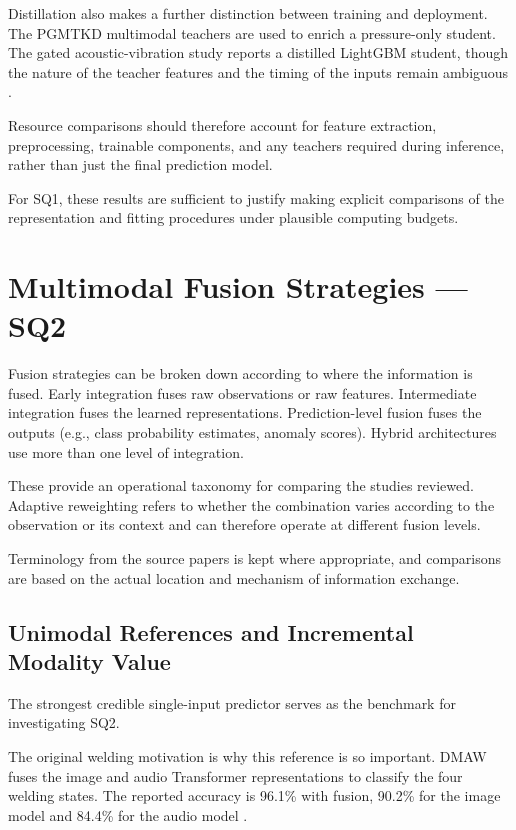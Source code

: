 Distillation also makes a further distinction between training and deployment. The PGMTKD multimodal
teachers are used to enrich a pressure-only student. The gated acoustic-vibration study reports a
distilled LightGBM student, though the nature of the teacher features and the timing of the inputs
remain ambiguous \citep{Li2025PGMTKD,Huang2026Rolling}.

Resource comparisons should therefore account for feature extraction, preprocessing, trainable
components, and any teachers required during inference, rather than just the final prediction model.

For SQ1, these results are sufficient to justify making explicit comparisons of the representation
and fitting procedures under plausible computing budgets.

\section{Multimodal Fusion Strategies --- SQ2}

Fusion strategies can be broken down according to where the information is fused. Early integration
fuses raw observations or raw features. Intermediate integration fuses the learned representations.
Prediction-level fusion fuses the outputs (e.g., class probability estimates, anomaly scores).
Hybrid architectures use more than one level of integration.

These provide an operational taxonomy for comparing the studies reviewed. Adaptive reweighting
refers to whether the combination varies according to the observation or its context and can
therefore operate at different fusion levels.

Terminology from the source papers is kept where appropriate, and comparisons are based on the
actual location and mechanism of information exchange.

\subsection{Unimodal References and Incremental Modality Value}

The strongest credible single-input predictor serves as the benchmark for investigating SQ2.

The original welding motivation is why this reference is so important. DMAW fuses the image and
audio Transformer representations to classify the four welding states. The reported accuracy is
96.1\% with fusion, 90.2\% for the image model and 84.4\% for the audio model \citep[PDF p.~7,
Table~III]{P003}.

